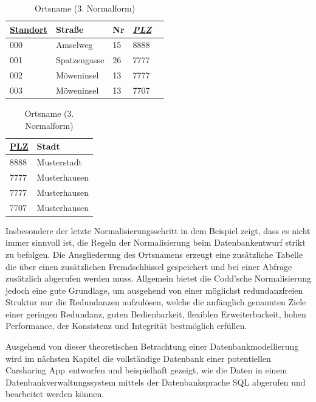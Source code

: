 \begin{table}[ht]
	\parbox{.5\linewidth}{
	\centering
	\caption{Standort (3. Normalform)}
	\label{table:3NF:Standort}
	\begin{tabular}{lllll} \toprule
		\underline{Standort} 	& Stra\ss e & Nr & \textit{\underline{PLZ}}\\ 
		\midrule
		000 & Amselweg & 15 & 8888 \\
		001 & Spatzengasse & 26 & 7777 \\
		002 & Möweninsel & 13 & 7777 \\
		003 & Möweninsel & 13 & 7707 \\
		\bottomrule
	\end{tabular}
	}
	\hfill
	\parbox{.5\linewidth}{
		\centering
		\caption{Ortsname (3. Normalform)}
		\label{table:3NF:Ortsname}
		\begin{tabular}{ll} \toprule
			\underline{PLZ} 	& Stadt \\ 
			\midrule
			8888 & Musterstadt \\
			7777 & Musterhausen \\
			7777 & Musterhausen \\
			7707 & Musterhausen \\
			\bottomrule
		\end{tabular}
	}
\end{table}

Insbesondere der letzte Normalisierungsschritt in dem Beispiel zeigt, dass es nicht immer sinnvoll ist, die Regeln der Normalisierung beim Datenbankentwurf strikt zu befolgen. Die Ausgliederung des Ortsnamens erzeugt eine zusätzliche Tabelle die über einen zusätzlichen Fremdschlüssel gespeichert und bei einer Abfrage zusätzlich abgerufen werden muss. Allgemein bietet die Codd'sche Normalisierung jedoch eine gute Grundlage, um ausgehend von einer möglichst redundanzfreien Struktur nur die Redundanzen aufzulösen, welche die anfänglich genannten Ziele einer geringen Redundanz, guten Bedienbarkeit, flexiblen Erweiterbarkeit, hohen Performance, der Konsistenz und Integrität bestmöglich erfüllen.

Ausgehend von dieser theoretischen Betrachtung einer Datenbankmodellierung wird im nächsten Kapitel die vollständige Datenbank einer potentiellen \glqq Carsharing App\grqq\ entworfen und beispielhaft gezeigt, wie die Daten in einem Datenbankverwaltungssystem mittels der Datenbanksprache SQL abgerufen und bearbeitet werden können.











